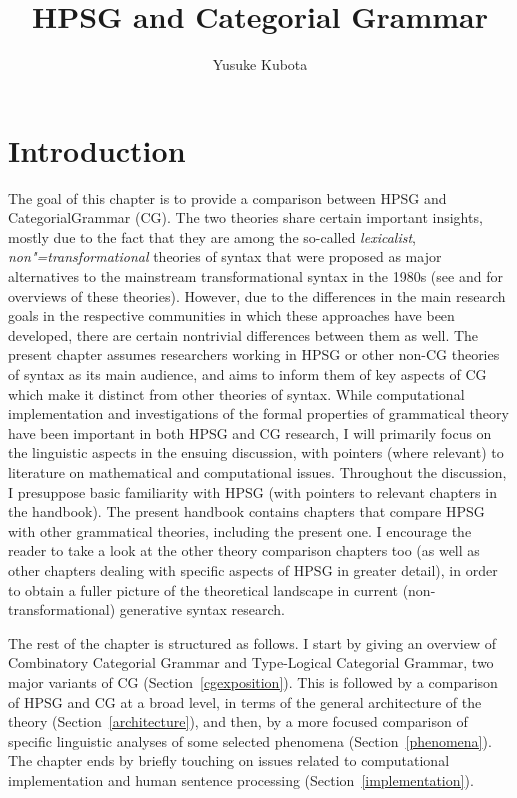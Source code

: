 \documentclass[output=paper,biblatex,babelshorthands,newtxmath,draftmode,colorlinks,citecolor=brown]{langscibook}
\author{Yusuke Kubota\affiliation{National Institute for Japanese Language and Linguistics}}
\title{HPSG and Categorial Grammar}
\begin{document}
\maketitle
\label{chap-cg}

\vspace{-\baselineskip}
\section{Introduction}

The goal of this chapter is to provide a comparison between HPSG and
Categorial\indexcg Grammar (CG). The two theories share certain important
insights, mostly due to the fact that they are among the so-called
\emph{lexicalist}, \emph{non"=transformational} theories of syntax that were
proposed as major alternatives to the mainstream transformational
syntax in the 1980s (see \citealt{BB2011a-ed} and \citealt{MuellerGT-Eng3}
for overviews of these 
theories). However, due to the differences in the main research goals
in the respective communities in which these approaches have been
developed, there are certain nontrivial differences between them as
well. The present chapter assumes researchers working in HPSG or other
non-CG theories of syntax as its main audience, and aims to inform
them of key aspects of CG which make it distinct from other theories
of syntax. While computational implementation and investigations of the
formal properties of grammatical theory have been important in both
HPSG and CG research, I will primarily focus on the linguistic aspects
in the ensuing discussion, with pointers (where relevant) to literature on mathematical
and computational issues. Throughout the discussion, I presuppose
basic familiarity with HPSG (with pointers to relevant chapters in the
handbook). The present handbook contains chapters that compare HPSG
with other grammatical theories, including the present one. I
encourage the reader to take a look at the other theory comparison
chapters too (as well as other chapters dealing with specific
aspects of HPSG in greater detail), in order to obtain a fuller picture of the
theoretical landscape in current (non-transformational) generative
syntax research.

The rest of the chapter is structured as follows. I start by giving an
overview of Combinatory Categorial Grammar and
Type-Logical Categorial Grammar, two major variants of CG (Section~\ref{cgexposition}).
This is followed by a comparison of HPSG and CG at a broad level, in
terms of the general architecture of the theory
(Section~\ref{architecture}), and then, by a more focused comparison
of specific linguistic analyses of some selected phenomena
(Section~\ref{phenomena}). The chapter ends by briefly touching on
issues related to computational implementation and human sentence
processing (Section~\ref{implementation}).
 
\end{document}
